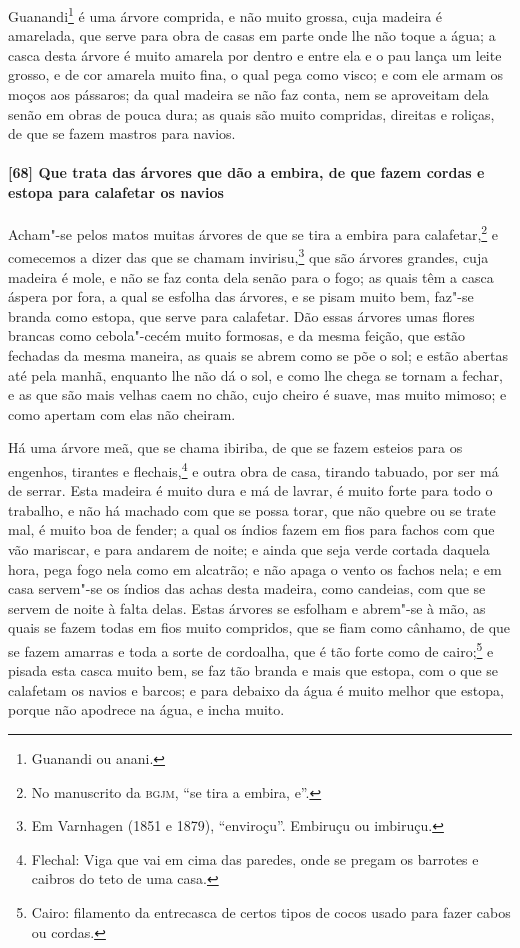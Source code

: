 Guanandi\footnote{ Guanandi ou anani.} é uma árvore comprida, e não muito grossa, cuja
madeira é amarelada, que serve para obra de casas em parte onde lhe não toque a água; a
casca desta árvore é muito amarela por dentro e entre ela e o pau lança um leite grosso, e
de cor amarela muito fina, o qual pega como visco; e com ele armam os moços aos pássaros;
da qual madeira se não faz conta, nem se aproveitam dela senão em obras de pouca dura; as
quais são muito compridas, direitas e roliças, de que se fazem mastros para navios.

\paragraph{[68] Que trata das árvores que dão a embira, de que fazem cordas e estopa para
calafetar os navios}\quad
Acham"-se pelos matos muitas árvores de que se tira a embira para calafetar,\footnote{ No
manuscrito da \textsc{bgjm}, ``se tira a embira, e''.} e comecemos a dizer das que se
chamam invirisu,\footnote{ Em Varnhagen (1851 e 1879), ``enviroçu''. Embiruçu ou
imbiruçu.} que são árvores grandes, cuja madeira é mole, e não se faz conta dela senão
para o fogo; as quais têm a casca áspera por fora, a qual se esfolha das árvores, e se
pisam muito bem, faz"-se branda como estopa, que serve para calafetar. Dão essas árvores
umas flores brancas como cebola"-cecém muito formosas, e da mesma feição, que estão
fechadas da mesma maneira, as quais se abrem como se põe o sol; e estão abertas até pela
manhã, enquanto lhe não dá o sol, e como lhe chega se tornam a fechar, e as que são mais
velhas caem no chão, cujo cheiro é suave, mas muito mimoso; e como apertam com elas não
cheiram.

Há uma árvore meã, que se chama ibiriba, de que se fazem esteios para os engenhos,
tirantes e flechais,\footnote{ Flechal: Viga que vai em cima das paredes, onde se pregam
os barrotes e caibros do teto de uma casa.} e outra obra de casa, tirando tabuado, por ser
má de serrar. Esta madeira é muito dura e má de lavrar, é muito forte para todo o
trabalho, e não há machado com que se possa torar, que não quebre ou se trate mal, é muito
boa de fender; a qual os índios fazem em fios para fachos com que vão mariscar, e para
andarem de noite; e ainda que seja verde cortada daquela hora, pega fogo nela como em
alcatrão; e não apaga o vento os fachos nela; e em casa servem"-se os índios das achas
desta madeira, como candeias, com que se servem de noite à falta delas. Estas árvores se
esfolham e abrem"-se à mão, as quais se fazem todas em fios muito compridos, que se fiam
como cânhamo, de que se fazem amarras e toda a sorte de cordoalha, que é tão forte como de
cairo;\footnote{ Cairo: filamento da entrecasca de certos tipos de cocos usado para fazer
cabos ou cordas.} e pisada esta casca muito bem, se faz tão branda e mais que estopa, com
o que se calafetam os navios e barcos; e para debaixo da água é muito melhor que estopa,
porque não apodrece na água, e incha muito.

